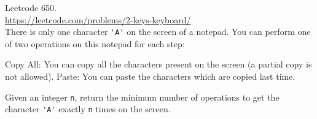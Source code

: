  Leetcode 650.
  \\
  \url{https://leetcode.com/problems/2-keys-keyboard/}
  \\
  There is only one character \verb!'A'! on the screen of a notepad.
  You can perform one of two operations on this notepad for each step:
  \begin{enumerate}[nosep]
    \li Copy All:
    You can copy all the characters present on the screen (a partial copy is
    not allowed).
    \li Paste: You can paste the characters which are copied last time.
  \end{enumerate}
  Given an integer \verb!n!, return the minimum number of operations to get the character \verb!'A'! exactly \verb!n! times on the screen.
